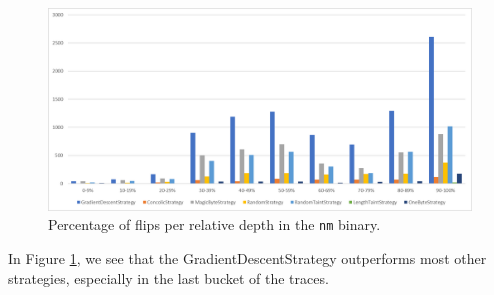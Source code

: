 \begin{figure}[H]
    \centering
    \includegraphics[width=.8\linewidth]{5_results/graphs/nm-depth-relative.png}  
    \caption{Percentage of flips per relative depth in the \texttt{nm} binary.}
    \label{fig:nmDepthRelative}
\end{figure}
In Figure \ref{fig:nmDepthRelative}, we see that the GradientDescentStrategy outperforms most other strategies, especially in the last bucket of the traces.

